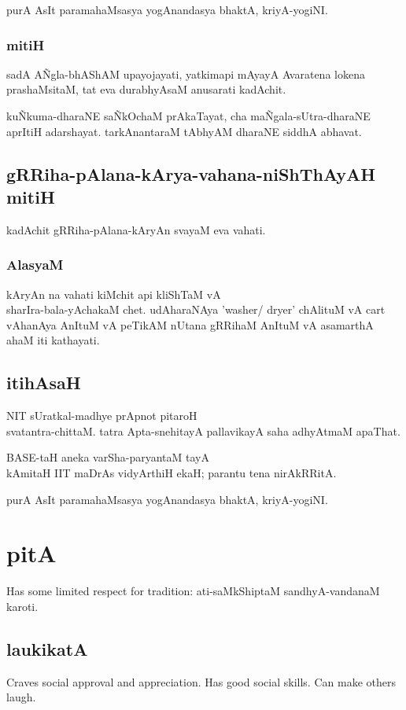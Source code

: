 \documentclass[oneside, article]{memoir}
\begin{document}
purA AsIt paramahaMsasya yogAnandasya bhaktA, kriyA-yogiNI.

\subsection{mitiH}
sadA A\~Ngla-bhAShAM upayojayati, yatkimapi mAyayA Avaratena lokena prashaMsitaM, tat eva durabhyAsaM anusarati kadAchit.

ku\~Nkuma-dharaNE sa\~NkOchaM prAkaTayat, cha ma\~Ngala-sUtra-dharaNE aprItiH adarshayat. tarkAnantaraM tAbhyAM dharaNE siddhA abhavat.


\section{gRRiha-pAlana-kArya-vahana-niShThAyAH mitiH}
kadAchit gRRiha-pAlana-kAryAn svayaM eva vahati.

\subsection{AlasyaM}
kAryAn na vahati kiMchit api kliShTaM vA \\sharIra-bala-yAchakaM chet. udAharaNAya 'washer/ dryer' chAlituM vA cart vAhanAya AnItuM vA peTikAM nUtana gRRihaM AnItuM vA asamarthA ahaM iti kathayati.

\section{itihAsaH}
NIT sUratkal-madhye prApnot pitaroH \\
svatantra-chittaM. tatra Apta-snehitayA pallavikayA saha adhyAtmaM apaThat.

BASE-taH aneka varSha-paryantaM tayA \\
kAmitaH IIT maDrAs vidyArthiH ekaH; parantu tena nirAkRRitA.

purA AsIt paramahaMsasya yogAnandasya bhaktA, kriyA-yogiNI.

\chapter{pitA}
Has some limited respect for tradition: ati-saMkShiptaM sandhyA-vandanaM karoti.

\section{laukikatA}
Craves social approval and appreciation. Has good social skills. Can make others laugh.
\end{document}
